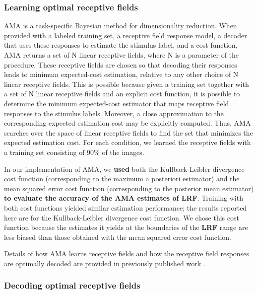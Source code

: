 \documentclass{jov}
\providecommand{\DIFaddtex}[1]{{\bf #1}} %
\providecommand{\DIFdeltex}[1]{} %
\providecommand{\DIFaddbegin}{} %
\providecommand{\DIFaddend}{} %
\providecommand{\DIFdelbegin}{} %
\providecommand{\DIFdelend}{} %
\providecommand{\DIFadd}[1]{\texorpdfstring{\DIFaddtex{#1}}{#1}} %
\providecommand{\DIFdel}[1]{\texorpdfstring{\DIFdeltex{#1}}{}} %
\newcommand{\DIFscaledelfig}{0.5}
\newlength{\DIFdelgraphicswidth} %
\newlength{\DIFdelgraphicsheight} %
\newcommand{\DIFaddincludegraphics}[2][]{{\color{blue}\fbox{\DIFOincludegraphics[#1]{#2}}}} %
\newcommand{\DIFdelincludegraphics}[2][]{%
\sbox{\DIFdelgraphicsbox}{\DIFOincludegraphics[#1]{#2}}%
\settoboxwidth{\DIFdelgraphicswidth}{\DIFdelgraphicsbox} %
\settoboxtotalheight{\DIFdelgraphicsheight}{\DIFdelgraphicsbox} %
\scalebox{\DIFscaledelfig}{%
\parbox[b]{\DIFdelgraphicswidth}{\usebox{\DIFdelgraphicsbox}\\[-\baselineskip] \rule{\DIFdelgraphicswidth}{0em}}\llap{\resizebox{\DIFdelgraphicswidth}{\DIFdelgraphicsheight}{%
\setlength{\unitlength}{\DIFdelgraphicswidth}%
\begin{picture}(1,1)%
\thicklines\linethickness{2pt} %
{\color[rgb]{1,0,0}\put(0,0){\framebox(1,1){}}}%
{\color[rgb]{1,0,0}\put(0,0){\line( 1,1){1}}}%
{\color[rgb]{1,0,0}\put(0,1){\line(1,-1){1}}}%
\end{picture}%
}\hspace*{3pt}}} %
} %
\DeclareRobustCommand{\DIFaddbegin}{\DIFOaddbegin \let\includegraphics\DIFaddincludegraphics} %
\DeclareRobustCommand{\DIFaddend}{\DIFOaddend \let\includegraphics\DIFOincludegraphics} %
\DeclareRobustCommand{\DIFdelbegin}{\DIFOdelbegin \let\includegraphics\DIFdelincludegraphics} %
\DeclareRobustCommand{\DIFdelend}{\DIFOaddend \let\includegraphics\DIFOincludegraphics} %
\begin{document}
\subsubsection*{Learning optimal receptive fields}
AMA is a task-specific Bayesian method for dimensionality reduction.
When provided with a labeled training set, a receptive field response model, a decoder that uses these responses to estimate the stimulus label, and a cost function, AMA returns a set of N linear receptive fields, where N is a parameter of the procedure.
These receptive fields are chosen so that decoding their responses leads to minimum expected-cost estimation, relative to any other choice of N linear receptive fields.
This is possible because given a training set together with a set of N linear receptive fields and an explicit cost function, it is possible to determine the minimum expected-cost estimator that maps receptive field responses to the stimulus labels.
Moreover, a close approximation to the corresponding expected estimation cost may be explicitly computed.
Thus, AMA searches over the space of linear receptive fields to find the set that minimizes the expected estimation cost.
For each condition, we learned the receptive fields with a training set consisting of 90\% of the images.

In our implementation of AMA, we \DIFdelbegin \DIFdel{explored }\DIFdelend \DIFaddbegin \DIFadd{used }\DIFaddend both the Kullback-Leibler divergence cost function (corresponding to the maximum a posteriori estimator) and the mean squared error cost function (corresponding to the posterior mean estimator) \DIFdelbegin \DIFdel{and assumed that receptive field responses were corrupted by scaled Gaussian noise (i.e. Poisson-like noise with a fano factor of 1.3)}\DIFdelend \DIFaddbegin \DIFadd{to evaluate the accuracy of the AMA estimates of LRF}\DIFaddend .
Training with both cost functions yielded similar estimation performance; the results reported here are for the Kullback-Leibler divergence cost function.
We chose this cost function because the estimates it yields at the boundaries of the \DIFdelbegin \DIFdel{LRV }\DIFdelend \DIFaddbegin \DIFadd{LRF }\DIFaddend range are less biased than those obtained with the mean squared error cost function.

Details of how AMA learns receptive fields and how the receptive field responses are optimally decoded are provided in previously published work \cite{geisler2009optimal,burge2017accuracy,jaini2017linking}.

\subsubsection*{Decoding optimal receptive fields}
\end{document}
